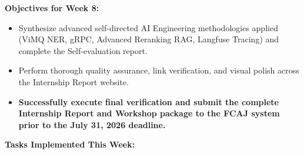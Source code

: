 \vspace{0.5em}\noindent\textbf{Objectives for Week 8:}

\begin{itemize}
\tightlist
\item
  Synthesize advanced self-directed AI Engineering methodologies applied
  (ViMQ NER, gRPC, Advanced Reranking RAG, Langfuse Tracing) and
  complete the Self-evaluation report.
\item
  Perform thorough quality assurance, link verification, and visual
  polish across the Internship Report website.
\item
  \textbf{Successfully execute final verification and submit the
  complete Internship Report and Workshop package to the FCAJ system
  prior to the July 31, 2026 deadline.}
\end{itemize}

\vspace{0.5em}\noindent\textbf{Tasks Implemented This Week:}

